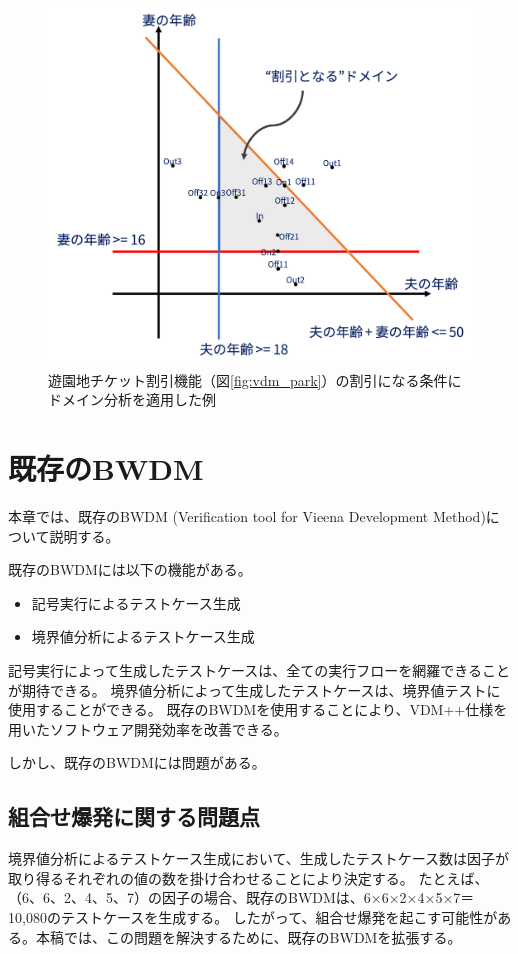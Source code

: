 \documentclass[uplatex, report, a4j, 10pt]{jsbook}
\newcommand{\tool}{BWDM}
\newcommand{\toolFullName}{Verification tool for Vieena Development Method}
\begin{document}
\begin{figure}[tp]
  \centering
  \includegraphics[keepaspectratio, width=160mm]{figs/domain_points}
  \caption{遊園地チケット割引機能（図\ref{fig:vdm_park}）の割引になる条件にドメイン分析を適用した例}
  \label{fig:domain_points}
\end{figure}



\chapter{既存の\tool{}}\label{cha:Exist}

本章では、既存の\tool{} (\toolFullName{})について説明する。

既存のBWDMには以下の機能がある。

\begin{itemize}
  \item 記号実行によるテストケース生成
  \item 境界値分析によるテストケース生成
\end{itemize}

記号実行によって生成したテストケースは、全ての実行フローを網羅できることが期待できる。
境界値分析によって生成したテストケースは、境界値テストに使用することができる。
既存のBWDMを使用することにより、VDM++仕様を用いたソフトウェア開発効率を改善できる。

しかし、既存のBWDMには問題がある。

\section{組合せ爆発に関する問題点}
境界値分析によるテストケース生成において、生成したテストケース数は因子が取り得るそれぞれの値の数を掛け合わせることにより決定する。
たとえば、（6、6、2、4、5、7）の因子の場合、既存のBWDMは、6×6×2×4×5×7＝10,080のテストケースを生成する。
したがって、組合せ爆発を起こす可能性がある。本稿では、この問題を解決するために、既存のBWDMを拡張する。
\end{document}
